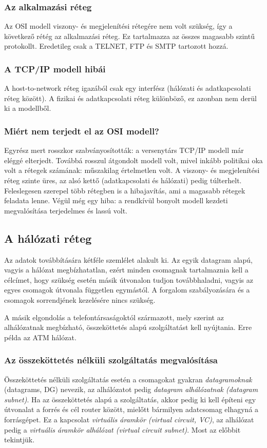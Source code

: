 \documentclass[fleqn,10pt,a4paper]{article}
\theoremstyle{magyar}
\begin{document}
  \subsubsection{Az alkalmazási réteg}
  Az OSI modell viszony- és megjelenítési rétegére nem volt szükség, így a következő rétég az alkalmazási réteg. Ez
  tartalmazza az összes magasabb szintű protokollt. Eredetileg csak a TELNET, FTP és SMTP tartozott hozzá.

  \subsubsection{A TCP/IP modell hibái}
  A host-to-network réteg igazából csak egy interfész (hálózati és adatkapcsolati réteg között). A fizikai és
  adatkapcsolati réteg különböző, ez azonban nem derül ki a modellből.

  \subsubsection{Miért nem terjedt el az OSI modell?}
  Egyrész mert rosszkor szabványosították: a versenytárs TCP/IP modell már eléggé elterjedt. Továbbá rosszul átgondolt
  modell volt, mivel inkább politikai oka volt a rétegek számának: műszakilag értelmetlen volt. A viszony- és
  megjelenítési réteg szinte üres, az alsó kettő (adatkapcsolati és hálózati) pedig túlterhelt. Feleslegesen szerepel
  több rétegben is a hibajavítás, ami a magasabb rétegek feladata lenne. Végül még egy hiba: a rendkívül bonyolt modell
  kezdeti megvalósítása terjedelmes és lassú volt.
  

  \subsection{A hálózati réteg}
  Az adatok továbbítására kétféle szemlélet alakult ki. Az egyik datagram alapú, vagyis a hálózat megbízhatatlan, ezért
  minden csomagnak tartalmaznia kell a célcímet, hogy szükség esetén másik útvonalon tudjon továbbhaladni, vagyis az
  egyes csomagok útvonala független egymástól. A forgalom szabályozására és a csomagok sorrendjének kezelésére nincs
  szükség.
  
  A másik elgondolás a telefontársaságoktól származott, mely szerint az alhálózatnak megbízható, összeköttetés alapú
  szolgáltatást kell nyújtania. Erre példa az ATM hálózat.
  
  \subsubsection{Az összeköttetés nélküli szolgáltatás megvalósítása}
  Összeköttetés nélküli szolgáltatás esetén a csomagokat gyakran \emph{datagramoknak} (datagrams, DG) nevezik, az
  alhálózatot pedig \emph{datagram alhálózatnak (datagram subnet)}. Ha az összeköttetés alapú a szolgáltatás, akkor pedig
  ki kell építeni egy útvonalat a forrés és cél router között, mielőtt bármilyen adatcsomag elhagyná a forrásgépet. Ez a
  kapcsolat \emph{virtuális áramkör (virtual circuit, VC)}, az alhálózat pedig a \emph{virtuális áramkör alhálózat
    (virtual circuit subnet)}. Most az előbbit tekintjük.
\end{document}
